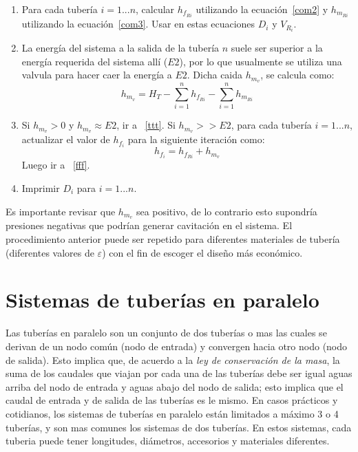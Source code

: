\documentclass[10pt, oneside]{article}
\begin{document}
\begin{enumerate}
\item Para cada tuber\'ia $i=1...n$, calcular $h_{f_{Ri}}$ utilizando la ecuaci\'on~\ref{com2} y $h_{m_{Ri}}$  utilizando la ecuaci\'on~\ref{com3}. Usar en estas ecuaciones $D_i$ y $V_{R_i}$.
\item La energ\'ia del sistema a la salida de la tuber\'ia $n$ suele ser superior a la energ\'ia requerida del sistema all\'i ($E2$), por lo que usualmente se utiliza una valvula para hacer caer la energ\'ia a $E2$. Dicha caida $h_{m_v}$, se calcula como:
\begin{equation} 
h_{m_v} = H_T - \sum_{i=1}^n h_{f_{Ri}} - \sum_{i=1}^n h_{m_{Ri}}
\label{desp2}
\end{equation}
\item Si $h_{m_v} > 0$ y $h_{m_v} \approx E2$, ir a ~\ref{ttt}. Si $h_{m_v} >> E2$, para cada tuber\'ia $i=1...n$, actualizar el valor de $h_{f_i}$ para la siguiente iteraci\'on como:
\begin{equation} 
h_{f_i} = h_{f_{Ri}} + h_{m_v}
\label{desp3}
\end{equation}
Luego ir a ~\ref{fff}.

\item \label{ttt} Imprimir $D_i$ para $i=1...n$.

\end{enumerate}

Es importante revisar que $h_{m_v}$ sea positivo, de lo contrario esto supondr\'ia presiones negativas que podr\'ian generar cavitaci\'on en el sistema. El procedimiento anterior puede ser repetido para diferentes materiales de tuber\'ia (diferentes valores de $\varepsilon$) con el fin de escoger el dise\~no m\'as econ\'omico.


\section{Sistemas de tuber\'ias en paralelo} 
Las tuber\'ias en paralelo son un conjunto de dos tuber\'ias o mas las cuales se derivan de un nodo com\'un (nodo de entrada) y convergen hacia otro nodo (nodo de salida). Esto implica que, de acuerdo a la \emph{ley de conservaci\'on de la masa}, la suma de los caudales que viajan por cada una de las tuber\'ias debe ser igual aguas arriba del nodo de entrada y aguas abajo del nodo de salida; esto implica que el caudal de entrada y de salida de las tuber\'ias es le mismo. En casos pr\'acticos y cotidianos, los sistemas de tuber\'ias en paralelo est\'an limitados a m\'aximo 3 o 4 tuber\'ias, y son mas comunes los sistemas de dos tuber\'ias. En estos sistemas, cada tuberia puede tener longitudes, di\'ametros, accesorios y materiales diferentes.  
\end{document}
